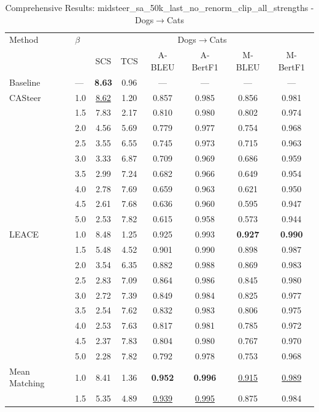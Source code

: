 \begin{table}[htbp]
\centering
\caption{Comprehensive Results: midsteer\_sa\_50k\_last\_no\_renorm\_clip\_all\_strengths - Dogs$\rightarrow$Cats}
\label{tab:midsteersa50klastnorenormclipallstrengths_dogstocats}
\begin{tabular}{l|l|cccccc|}
\hline
Method & $\beta$ & \multicolumn{6}{c|}{Dogs$\rightarrow$Cats} \\
 &  & SCS & TCS & A-BLEU & A-BertF1 & M-BLEU & M-BertF1 \\
\hline
Baseline & — & \textbf{8.63} & 0.96 & — & — & — & — \\
\hline
CASteer & 1.0 & \underline{8.62} & 1.20 & 0.857 & 0.985 & 0.856 & 0.981 \\
 & 1.5 & 7.83 & 2.17 & 0.810 & 0.980 & 0.802 & 0.974 \\
 & 2.0 & 4.56 & 5.69 & 0.779 & 0.977 & 0.754 & 0.968 \\
 & 2.5 & 3.55 & 6.55 & 0.745 & 0.973 & 0.715 & 0.963 \\
 & 3.0 & 3.33 & 6.87 & 0.709 & 0.969 & 0.686 & 0.959 \\
 & 3.5 & 2.99 & 7.24 & 0.682 & 0.966 & 0.649 & 0.954 \\
 & 4.0 & 2.78 & 7.69 & 0.659 & 0.963 & 0.621 & 0.950 \\
 & 4.5 & 2.61 & 7.68 & 0.636 & 0.960 & 0.595 & 0.947 \\
 & 5.0 & 2.53 & 7.82 & 0.615 & 0.958 & 0.573 & 0.944 \\
\hline
LEACE & 1.0 & 8.48 & 1.25 & 0.925 & 0.993 & \textbf{0.927} & \textbf{0.990} \\
 & 1.5 & 5.48 & 4.52 & 0.901 & 0.990 & 0.898 & 0.987 \\
 & 2.0 & 3.54 & 6.35 & 0.882 & 0.988 & 0.869 & 0.983 \\
 & 2.5 & 2.83 & 7.09 & 0.864 & 0.986 & 0.845 & 0.980 \\
 & 3.0 & 2.72 & 7.39 & 0.849 & 0.984 & 0.825 & 0.977 \\
 & 3.5 & 2.54 & 7.62 & 0.832 & 0.983 & 0.806 & 0.975 \\
 & 4.0 & 2.53 & 7.63 & 0.817 & 0.981 & 0.785 & 0.972 \\
 & 4.5 & 2.37 & 7.83 & 0.804 & 0.980 & 0.767 & 0.970 \\
 & 5.0 & 2.28 & 7.82 & 0.792 & 0.978 & 0.753 & 0.968 \\
\hline
Mean Matching & 1.0 & 8.41 & 1.36 & \textbf{0.952} & \textbf{0.996} & \underline{0.915} & \underline{0.989} \\
 & 1.5 & 5.35 & 4.89 & \underline{0.939} & \underline{0.995} & 0.875 & 0.984 \\

\end{tabular}
\end{table}
